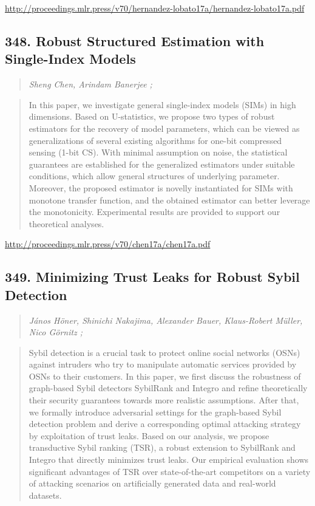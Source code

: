 \documentclass{article}
\begin{document}
\href{http://proceedings.mlr.press/v70/hernandez-lobato17a/hernandez-lobato17a.pdf}{http://proceedings.mlr.press/v70/hernandez-lobato17a/hernandez-lobato17a.pdf}

\subsection{348. Robust Structured Estimation with Single-Index Models}

\begin{quote}
\footnotesize{\textit{Sheng Chen, Arindam Banerjee ;}}

\end{quote}

\begin{quote}
    In this paper, we investigate general single-index models (SIMs) in high dimensions. Based on U-statistics, we propose two types of robust estimators for the recovery of model parameters, which can be viewed as generalizations of several existing algorithms for one-bit compressed sensing (1-bit CS). With minimal assumption on noise, the statistical guarantees are established for the generalized estimators under suitable conditions, which allow general structures of underlying parameter. Moreover, the proposed estimator is novelly instantiated for SIMs with monotone transfer function, and the obtained estimator can better leverage the monotonicity. Experimental results are provided to support our theoretical analyses.  
\end{quote}

\href{http://proceedings.mlr.press/v70/chen17a/chen17a.pdf}{http://proceedings.mlr.press/v70/chen17a/chen17a.pdf}

\subsection{349. Minimizing Trust Leaks for Robust Sybil Detection}

\begin{quote}
\footnotesize{\textit{János Höner, Shinichi Nakajima, Alexander Bauer, Klaus-Robert Müller, Nico Görnitz ;}}

\end{quote}

\begin{quote}
    Sybil detection is a crucial task to protect online social networks (OSNs) against intruders who try to manipulate automatic services provided by OSNs to their customers. In this paper, we first discuss the robustness of graph-based Sybil detectors SybilRank and Integro and refine theoretically their security guarantees towards more realistic assumptions. After that, we formally introduce adversarial settings for the graph-based Sybil detection problem and derive a corresponding optimal attacking strategy by exploitation of trust leaks. Based on our analysis, we propose transductive Sybil ranking (TSR), a robust extension to SybilRank and Integro that directly minimizes trust leaks. Our empirical evaluation shows significant advantages of TSR over state-of-the-art competitors on a variety of attacking scenarios on artificially generated data and real-world datasets.  
\end{quote}
\end{document}
